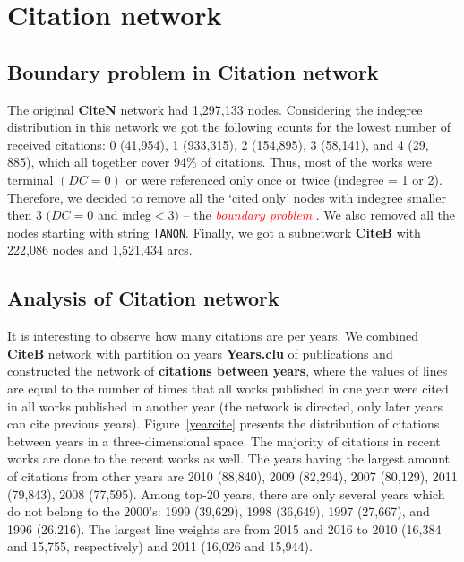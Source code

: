 \documentclass[11pt]{article} %
\newcommand{\keyw}[1]{\textcolor{red}{\emph{#1}}}
\begin{document}
\section{Citation network}  

\subsection{Boundary problem in Citation network}

The original \textbf{CiteN} network  had 1,297,133 nodes. Considering the indegree distribution in this network we got the following  counts for the lowest number of received citations: 0 (41,954), 1 (933,315), 2 (154,895), 3 (58,141), and 4 (29, 885), which all together  cover 94\% of citations. Thus, most of the works were terminal $(DC=0)$ or were referenced only once or twice (indegree = 1 or 2). Therefore, we decided to remove all the `cited only' nodes with indegree smaller then 3 $(DC = 0$ and indeg$<3)$ -- the \keyw{boundary problem} \citep{Understand}. We also removed all the nodes starting with string \texttt{[ANON}.  Finally, we got a subnetwork \textbf{CiteB} with  222,086 nodes and 1,521,434 arcs.

\subsection{Analysis of Citation network}

It is interesting to observe how many citations are per years. We combined \textbf{CiteB} network with partition on years \textbf{Years.clu} of publications and constructed the network of  \textbf{citations between years}, where the values of lines are equal to the number of times that all works published in one year were cited in all works published in another year (the network is directed, only later years can cite previous years). Figure~\ref{yearcite} presents the distribution of citations between years in a three-dimensional space. The majority of citations in recent works are done to the recent works as well. The years having the largest amount of citations from other years are 2010 (88,840), 2009 (82,294), 2007 (80,129), 2011 (79,843), 2008 (77,595). Among top-20 years, there are only several years which do not belong to the 2000's: 1999 (39,629), 1998 (36,649), 1997 (27,667), and 1996 (26,216). The largest line weights are from 2015 and 2016 to 2010 (16,384 and 15,755, respectively) and 2011 (16,026 and 15,944). \medskip
\end{document}
